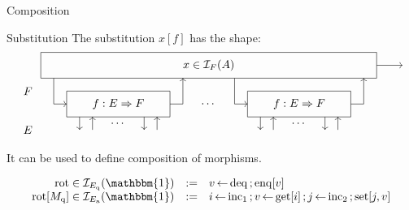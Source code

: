 \documentclass[aspectratio=141]{beamer}
\newcommand{\kw}[1]{\ensuremath{ \mathrm{#1} }}
\begin{document}
\begin{frame}{Composition} %
  \begin{block}{Substitution}
    The substitution $x[f]$ has the shape:
    \[
    \begin{tikzpicture}[scale=0.4]
      \draw[->] (13, 3) -- (15, 3);
      \draw (-13, 2) rectangle (13, 4);
      \node at (0, 3) {$x \in \mathcal{I}_F(A)$};
      \begin{scope}[xshift=-7cm]
        \draw (-4,-1) rectangle (4,1);
        \draw[->] (-5, 2) |- (-4,0);
        \draw[->] (4,0) -| (5,2);
        \node (f) at (0,0) {$f : E \Rightarrow F$};
        \draw[->] (-3, -1) -- (-3, -2);
        \draw[->] (-2, -2) -- (-2, -1);
        \node[below] at (0, -1) {$\cdots$};
        \draw[->] (2, -1) -- (2, -2);
        \draw[->] (3, -2) -- (3, -1);
      \end{scope}
      \node at (0, 0) {$\cdots$};
      \begin{scope}[xshift=7cm]
        \draw (-4,-1) rectangle (4,1);
        \draw[->] (-5, 2) |- (-4,0);
        \draw[->] (4,0) -| (5,2);
        \node (f) at (0,0) {$f : E \Rightarrow F$};
        \draw[->] (-3, -1) -- (-3, -2);
        \draw[->] (-2, -2) -- (-2, -1);
        \node[below] at (0, -1) {$\cdots$};
        \draw[->] (2, -1) -- (2, -2);
        \draw[->] (3, -2) -- (3, -1);
      \end{scope}
      \node at (-14,  1) {$F$};
      \node at (-14, -2) {$E$};
    \end{tikzpicture}
    \]
    It can be used to define composition of morphisms.
  \end{block}
  \pause
  \begin{example}
    \vspace{-1em}
    \[ \begin{array}{r@{{} \in {}}c@{\quad := \quad}l}
      \kw{rot} & \mathcal{I}_{E_\kw{q}}(\mathbbm{1}) &
        v \mathop{\leftarrow} \kw{deq} \mathop{;} \kw{enq}[v] \\
      \kw{rot}[M_\kw{q}] & \mathcal{I}_{E_\kw{a}}(\mathbbm{1}) &
        i \mathop{\leftarrow} \kw{inc}_1 \mathop{;}
        v \mathop{\leftarrow} \kw{get}[i] \mathop{;}
        j \mathop{\leftarrow} \kw{inc}_2 \mathop{;}
        \kw{set}[j, v]
    \end{array} \]
  \end{example}
\end{frame}
\end{document}
